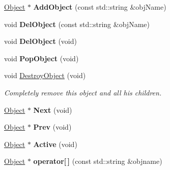 \begin{DoxyCompactItemize}
\item 
\hypertarget{class_scene_a2a3a5e4f5ea44d086ff73f2420663a10}{\hyperlink{class_object}{Object} $\ast$ {\bfseries Add\-Object} (const std\-::string \&obj\-Name)}\label{class_scene_a2a3a5e4f5ea44d086ff73f2420663a10}

\item 
\hypertarget{class_scene_a3bd9fa1058f506c04162b9283e97d20e}{void {\bfseries Del\-Object} (const std\-::string \&obj\-Name)}\label{class_scene_a3bd9fa1058f506c04162b9283e97d20e}

\item 
\hypertarget{class_scene_a43fd3c56db5dc940d1724b9573c9a360}{void {\bfseries Del\-Object} (void)}\label{class_scene_a43fd3c56db5dc940d1724b9573c9a360}

\item 
\hypertarget{class_scene_abdfd15e7987aa261840d5ecc265170df}{void {\bfseries Pop\-Object} (void)}\label{class_scene_abdfd15e7987aa261840d5ecc265170df}

\item 
\hypertarget{class_scene_a82759ded1f6f87a91b8d10ed87501958}{void \hyperlink{class_scene_a82759ded1f6f87a91b8d10ed87501958}{Destroy\-Object} (void)}\label{class_scene_a82759ded1f6f87a91b8d10ed87501958}

\begin{DoxyCompactList}\small\item\em Completely remove this object and all his children. \end{DoxyCompactList}\item 
\hypertarget{class_scene_a0a57ee2c15864c55cf3284b937440330}{\hyperlink{class_object}{Object} $\ast$ {\bfseries Next} (void)}\label{class_scene_a0a57ee2c15864c55cf3284b937440330}

\item 
\hypertarget{class_scene_a955c5c984cc6bc5fb532752e43256211}{\hyperlink{class_object}{Object} $\ast$ {\bfseries Prev} (void)}\label{class_scene_a955c5c984cc6bc5fb532752e43256211}

\item 
\hypertarget{class_scene_a50f6c9e9aa2e243da5e86bf3470c809e}{\hyperlink{class_object}{Object} $\ast$ {\bfseries Active} (void)}\label{class_scene_a50f6c9e9aa2e243da5e86bf3470c809e}

\item 
\hypertarget{class_scene_ae9b69d8db8a46991017635f22e45baad}{\hyperlink{class_object}{Object} $\ast$ {\bfseries operator\mbox{[}$\,$\mbox{]}} (const std\-::string \&objname)}\label{class_scene_ae9b69d8db8a46991017635f22e45baad}

\end{DoxyCompactItemize}
